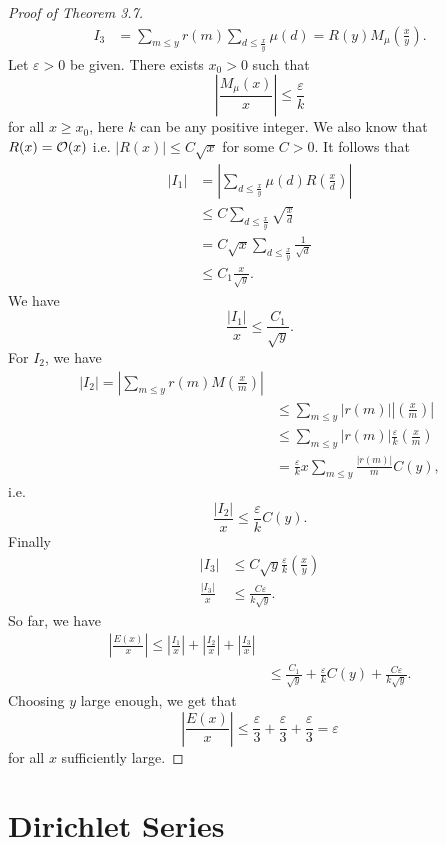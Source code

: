 \documentclass[twoside, openright, fontsize=10pt, headings=big]{scrbook}
\begin{document}
\begin{proof}[Proof of Theorem 3.7]
\begin{align*}
        I_3&=\sum_{m\leq y}r(m)\sum_{d\leq\frac{x}{y}}\mu(d)=R(y)M_{\mu}\left(\frac{x}{y}\right).
    \end{align*}
    Let $\varepsilon>0$ be given. There exists $x_0>0$ such that
    \[
        \left|\frac{M_{\mu}(x)}{x}\right|\leq\frac{\varepsilon}{k}
    \]
    for all $x\geq x_0$, here $k$ can be any positive integer. We also know that $R(x)=\mathcal{O}(x)$ i.e. $|R(x)|\leq C\sqrt{x}$ for some $C>0$. It follows that 
    \begin{align*}
        |I_1|&=\left|\sum_{d\leq\frac{x}{y}}\mu(d)R\left(\frac{x}{d}\right)\right|\\
        &\leq C\sum_{d\leq\frac{x}{y}}\sqrt{\frac{x}{d}}\\
        &=C\sqrt{x}\sum_{d\leq\frac{x}{y}}\frac{1}{\sqrt{d}}\\
        &\leq C_1\frac{x}{\sqrt{y}}.
    \end{align*}
    We have
    \[
        \frac{|I_1|}{x}\leq\frac{C_1}{\sqrt{y}}.
    \]
    For $I_2$, we have
    \begin{align*}
        |I_2|=\left|\sum_{m\leq y}r(m)M\left(\frac{x}{m}\right)\right|\\
        &\leq\sum_{m\leq y}|r(m)|\left|\left(\frac{x}{m}\right)\right|\\
        &\leq\sum_{m\leq y}|r(m)|\frac{\varepsilon}{k}\left(\frac{x}{m}\right)\\
        &=\frac{\varepsilon}{k}x\sum_{m\leq y}\frac{|r(m)|}{m}C(y),
    \end{align*}
    i.e. 
    \[
        \frac{|I_2|}{x}\leq\frac{\varepsilon}{k}C(y).
    \]
    Finally 
    \begin{align*}
        |I_3|&\leq C\sqrt{y}\frac{\varepsilon}{k}\left(\frac{x}{y}\right)\\
        \frac{|I_3|}{x}&\leq\frac{C\varepsilon}{k\sqrt{y}}.
    \end{align*}
    So far, we have
    \begin{align*}
        \left|\frac{E(x)}{x}\right|\leq\left|\frac{I_1}{x}\right|+\left|\frac{I_2}{x}\right|+\left|\frac{I_3}{x}\right|\\
        &\leq\frac{C_1}{\sqrt{y}}+\frac{\varepsilon}{k}C(y)+\frac{C\varepsilon}{k\sqrt{y}}.
    \end{align*}
    Choosing $y$ large enough, we get that
    \[
        \left|\frac{E(x)}{x}\right|\leq\frac{\varepsilon}{3}+\frac{\varepsilon}{3}+\frac{\varepsilon}{3}=\varepsilon
    \]
    for all $x$ sufficiently large.
\end{proof}
\chapter{Dirichlet Series }
\end{document}
